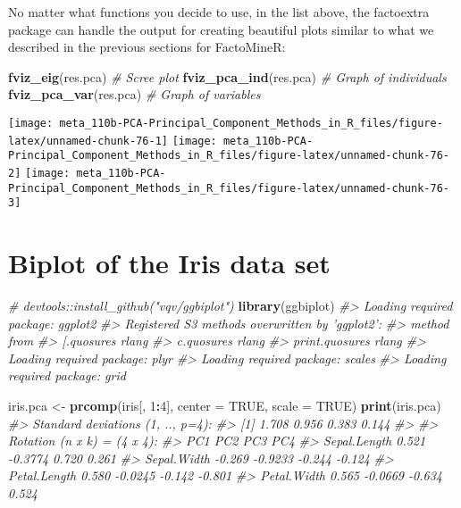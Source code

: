 \documentclass[]{book}
\newenvironment{Shaded}{\begin{snugshade}}{\end{snugshade}}
\newcommand{\CommentTok}[1]{\textcolor[rgb]{0.56,0.35,0.01}{\textit{#1}}}
\newcommand{\DataTypeTok}[1]{\textcolor[rgb]{0.13,0.29,0.53}{#1}}
\newcommand{\DecValTok}[1]{\textcolor[rgb]{0.00,0.00,0.81}{#1}}
\newcommand{\KeywordTok}[1]{\textcolor[rgb]{0.13,0.29,0.53}{\textbf{#1}}}
\newcommand{\NormalTok}[1]{#1}
\newcommand{\OperatorTok}[1]{\textcolor[rgb]{0.81,0.36,0.00}{\textbf{#1}}}
\newcommand{\OtherTok}[1]{\textcolor[rgb]{0.56,0.35,0.01}{#1}}
\newcommand{\StringTok}[1]{\textcolor[rgb]{0.31,0.60,0.02}{#1}}
\begin{document}
No matter what functions you decide to use, in the list above, the factoextra package can handle the output for creating beautiful plots similar to what we described in the previous sections for FactoMineR:

\begin{Shaded}
\begin{Highlighting}[]
\KeywordTok{fviz_eig}\NormalTok{(res.pca)     }\CommentTok{# Scree plot}
\KeywordTok{fviz_pca_ind}\NormalTok{(res.pca) }\CommentTok{# Graph of individuals}
\KeywordTok{fviz_pca_var}\NormalTok{(res.pca) }\CommentTok{# Graph of variables}
\end{Highlighting}
\end{Shaded}

\begin{center}\texttt{[image: meta\_110b-PCA-Principal\_Component\_Methods\_in\_R\_files/figure-latex/unnamed-chunk-76-1]} \texttt{[image: meta\_110b-PCA-Principal\_Component\_Methods\_in\_R\_files/figure-latex/unnamed-chunk-76-2]} \texttt{[image: meta\_110b-PCA-Principal\_Component\_Methods\_in\_R\_files/figure-latex/unnamed-chunk-76-3]} \end{center}

\hypertarget{biplot-of-the-iris-data-set}{%
\chapter{Biplot of the Iris data set}\label{biplot-of-the-iris-data-set}}

\begin{Shaded}
\begin{Highlighting}[]
\CommentTok{# devtools::install_github("vqv/ggbiplot")}
\KeywordTok{library}\NormalTok{(ggbiplot)}
\CommentTok{#> Loading required package: ggplot2}
\CommentTok{#> Registered S3 methods overwritten by 'ggplot2':}
\CommentTok{#>   method         from }
\CommentTok{#>   [.quosures     rlang}
\CommentTok{#>   c.quosures     rlang}
\CommentTok{#>   print.quosures rlang}
\CommentTok{#> Loading required package: plyr}
\CommentTok{#> Loading required package: scales}
\CommentTok{#> Loading required package: grid}

\NormalTok{iris.pca <-}\StringTok{ }\KeywordTok{prcomp}\NormalTok{(iris[, }\DecValTok{1}\OperatorTok{:}\DecValTok{4}\NormalTok{], }\DataTypeTok{center =} \OtherTok{TRUE}\NormalTok{, }\DataTypeTok{scale =} \OtherTok{TRUE}\NormalTok{)}
\KeywordTok{print}\NormalTok{(iris.pca)}
\CommentTok{#> Standard deviations (1, .., p=4):}
\CommentTok{#> [1] 1.708 0.956 0.383 0.144}
\CommentTok{#> }
\CommentTok{#> Rotation (n x k) = (4 x 4):}
\CommentTok{#>                 PC1     PC2    PC3    PC4}
\CommentTok{#> Sepal.Length  0.521 -0.3774  0.720  0.261}
\CommentTok{#> Sepal.Width  -0.269 -0.9233 -0.244 -0.124}
\CommentTok{#> Petal.Length  0.580 -0.0245 -0.142 -0.801}
\CommentTok{#> Petal.Width   0.565 -0.0669 -0.634  0.524}
\end{Highlighting}
\end{Shaded}
\end{document}
